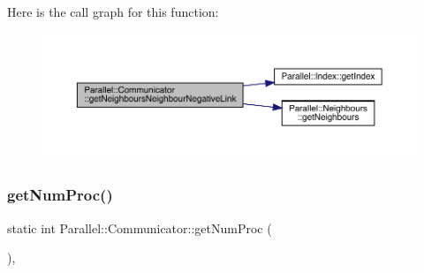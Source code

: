 Here is the call graph for this function\+:
\nopagebreak
\begin{figure}[H]
\begin{center}
\leavevmode
\includegraphics[width=350pt]{class_parallel_1_1_communicator_a1c598fae96e05e3b36db368e60453d63_cgraph}
\end{center}
\end{figure}
\mbox{\label{class_parallel_1_1_communicator_a7b1f80fb49a0cc83f2031c3415174150}} 
\subsubsection{\texorpdfstring{getNumProc()}{getNumProc()}}
{\footnotesize\ttfamily static int Parallel\+::\+Communicator\+::get\+Num\+Proc (\begin{DoxyParamCaption}{ }\end{DoxyParamCaption})\hspace{0.3cm}{\ttfamily [inline]}, {\ttfamily [static]}}

